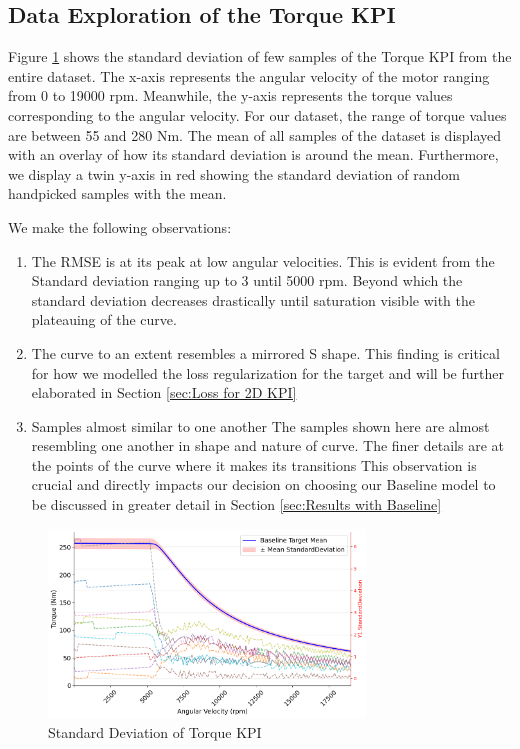 \documentclass{report} %
\begin{document}
\subsection{Data Exploration of the Torque \ac{KPI}}\label{subsec:Deep Dive into 2D KPI}
Figure \ref{fig:Standard Deviation of 2D KPI} shows the standard deviation of few samples of the Torque \ac{KPI} from the entire dataset.
The x-axis represents the angular velocity of the motor ranging from 0 to 19000 rpm. Meanwhile, the y-axis represents the torque values corresponding to the angular velocity.
For our dataset, the range of torque values are between 55 and 280 Nm. 
The mean of all samples of the dataset is displayed with an overlay of how its standard deviation is around the mean.
Furthermore, we display a twin y-axis in red showing the standard deviation of random handpicked samples with the mean.

We make the following observations:
\begin{enumerate}
    \item The \ac{RMSE} is at its peak at low angular velocities.
    This is evident from the Standard deviation ranging up to 3 until 5000 rpm. Beyond which the standard deviation decreases drastically until 
    saturation visible with the plateauing of the curve.
    \item The curve to an extent resembles a mirrored S shape.                             
    This finding is critical for how we modelled the loss regularization for the target and will be further elaborated in Section \ref{sec:Loss for 2D KPI}
    \item Samples almost similar to one another
    The samples shown here are almost resembling one another in shape and nature of curve. The finer details are at the points of the curve where it makes its transitions 
    This observation is crucial and directly impacts our  decision on choosing our Baseline model to be discussed in greater detail in Section \ref{sec:Results with Baseline}
\end{enumerate}

\begin{figure}[H]
    \centering
    \includegraphics[width=0.75\textwidth]{./ReportImages/StandardDeviation_Baseline_y1.png} 
    \caption{Standard Deviation of Torque KPI} 
    \label{fig:Standard Deviation of 2D KPI}
\end{figure}
\end{document}
